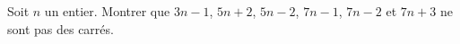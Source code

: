 Soit $n$ un entier. Montrer que $3n - 1$, $5n + 2$, $5n - 2$, $7n - 1$, $7n - 2$ et $7n + 3$ ne sont pas des carrés.
